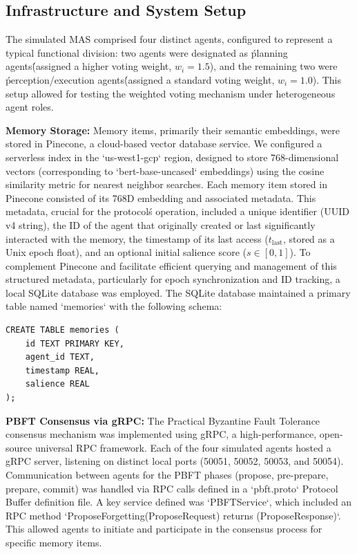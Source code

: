\documentclass[conference]{IEEEtran}
\begin{document}
\subsection{Infrastructure and System Setup}

The simulated MAS comprised four distinct agents, configured to represent a typical functional division: two agents were designated as \'planning agents\' (assigned a higher voting weight, $w_i = 1.5$), and the remaining two were \'perception/execution agents\' (assigned a standard voting weight, $w_i = 1.0$). This setup allowed for testing the weighted voting mechanism under heterogeneous agent roles.

\textbf{Memory Storage:} Memory items, primarily their semantic embeddings, were stored in Pinecone, a cloud-based vector database service. We configured a serverless index in the `us-west1-gcp` region, designed to store 768-dimensional vectors (corresponding to `bert-base-uncased` embeddings) using the cosine similarity metric for nearest neighbor searches. Each memory item stored in Pinecone consisted of its 768D embedding and associated metadata. This metadata, crucial for the protocol\'s operation, included a unique identifier (UUID v4 string), the ID of the agent that originally created or last significantly interacted with the memory, the timestamp of its last access ($t_{\text{last}}$, stored as a Unix epoch float), and an optional initial salience score ($s \in [0, 1]$). To complement Pinecone and facilitate efficient querying and management of this structured metadata, particularly for epoch synchronization and ID tracking, a local SQLite database was employed. The SQLite database maintained a primary table named `memories` with the following schema:

\begin{verbatim}
CREATE TABLE memories (
    id TEXT PRIMARY KEY,
    agent_id TEXT,
    timestamp REAL,
    salience REAL
);
\end{verbatim}

\textbf{PBFT Consensus via gRPC:} The Practical Byzantine Fault Tolerance consensus mechanism was implemented using gRPC, a high-performance, open-source universal RPC framework. Each of the four simulated agents hosted a gRPC server, listening on distinct local ports (50051, 50052, 50053, and 50054). Communication between agents for the PBFT phases (propose, pre-prepare, prepare, commit) was handled via RPC calls defined in a `pbft.proto` Protocol Buffer definition file. A key service defined was `PBFTService`, which included an RPC method `ProposeForgetting(ProposeRequest) returns (ProposeResponse)`. This allowed agents to initiate and participate in the consensus process for specific memory items.
\end{document}
